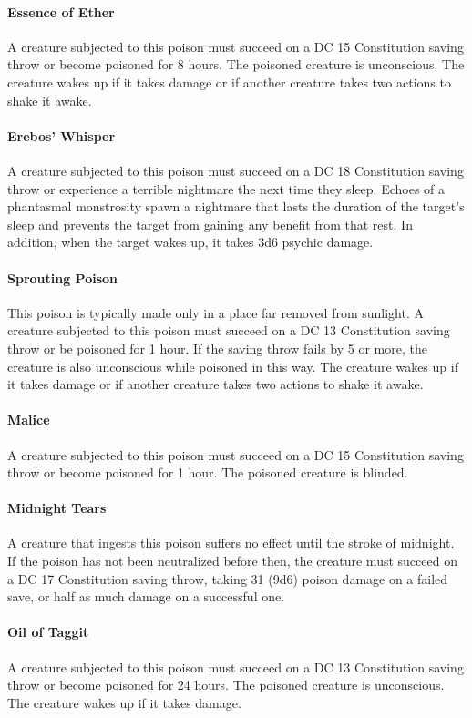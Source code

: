     \paragraph{Essence of Ether}
        A creature subjected to this poison must succeed on a DC 15 Constitution saving throw or become poisoned for 8 hours.
        The poisoned creature is unconscious.
        The creature wakes up if it takes damage or if another creature takes two actions to shake it awake.
    \paragraph{Erebos' Whisper}
        A creature subjected to this poison must succeed on a DC 18 Constitution saving throw or experience a terrible nightmare the next time they sleep.
        Echoes of a phantasmal monstrosity spawn a nightmare that lasts the duration of the target's sleep and prevents the target from gaining any benefit from that rest.
        In addition, when the target wakes up, it takes 3d6 psychic damage.
    \paragraph{Sprouting Poison}
        This poison is typically made only in a place far removed from sunlight.
        A creature subjected to this poison must succeed on a DC 13 Constitution saving throw or be poisoned for 1 hour.
        If the saving throw fails by 5 or more, the creature is also unconscious while poisoned in this way.
        The creature wakes up if it takes damage or if another creature takes two actions to shake it awake.
    \paragraph{Malice}
        A creature subjected to this poison must succeed on a DC 15 Constitution saving throw or become poisoned for 1 hour.
        The poisoned creature is blinded.
    \paragraph{Midnight Tears}
        A creature that ingests this poison suffers no effect until the stroke of midnight.
        If the poison has not been neutralized before then, the creature must succeed on a DC 17 Constitution saving throw, taking 31 (9d6) poison damage on a failed save, or half as much damage on a successful one.
    \paragraph{Oil of Taggit}
        A creature subjected to this poison must succeed on a DC 13 Constitution saving throw or become poisoned for 24 hours.
        The poisoned creature is unconscious.
        The creature wakes up if it takes damage.
